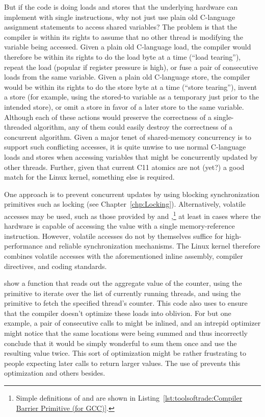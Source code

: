 \begin{fcvref}
{	But if the code is doing loads and stores that the underlying
	hardware can implement with single instructions, why not just
	use plain old C-language assignment statements to access shared
	variables?
	The problem is that the compiler is within its rights to assume
	that no other thread is modifying the variable being accessed.
	Given a plain old C-language load, the compiler would therefore
	be within its rights to do the load byte at a time
	(``load tearing''), repeat the load (popular if register
	pressure is high), or fuse a pair of consecutive loads from
	the same variable.
	Given a plain old C-language store, the compiler would be within
	its rights to do the store byte at a time (``store tearing''),
	invent a store (for example, using the stored-to variable as
	a temporary just prior to the intended store), or omit a store
	in favor of a later store to the same variable.
	Although each of these actions would preserve the correctness
	of a single-threaded algorithm, any of them could easily destroy
	the correctness of a concurrent algorithm.
	Given a major tenet of shared-memory concurrency is to support
	such conflicting accesses, it is quite unwise to use normal
	C-language loads and stores when accessing variables that might
	be concurrently updated by other threads.
	Further, given that current C11 atomics are not (yet?) a good
	match for the Linux kernel, something else is required.

	One approach is to prevent concurrent updates by using
	blocking synchronization primitives such as locking
	(see Chapter~\ref{chp:Locking}).
	Alternatively, volatile accesses may be used, such as those provided
	by  and ,\footnote{
		Simple definitions of  and
		 are shown in
		Listing~\ref{lst:toolsoftrade:Compiler Barrier Primitive (for GCC)}.}
	at least in cases where the hardware is capable of accessing
	the value with a single memory-reference instruction.
	However, volatile accesses do not by themselves suffice for
	high-performance and reliable synchronization mechanisms.
	The Linux kernel therefore combines volatile accesses with
	the aforementioned inline assembly, compiler directives, and
	coding standards.
}\QuickQuizEnd

show a function that reads out the aggregate value of the counter,
using the  primitive to iterate over the list of
currently running threads, and using the  primitive
to fetch the specified thread's counter.
This code also uses  to ensure that the compiler doesn't
optimize these loads into oblivion.
For but one example, a pair of consecutive calls to 
might be inlined, and an intrepid optimizer might notice that the same
locations were being summed and thus incorrectly conclude that it would
be simply wonderful to sum them once and use the resulting value twice.
This sort of optimization might be rather frustrating to people expecting
later  calls to return larger values.
The use of  prevents this optimization and others besides.
\end{fcvref}

